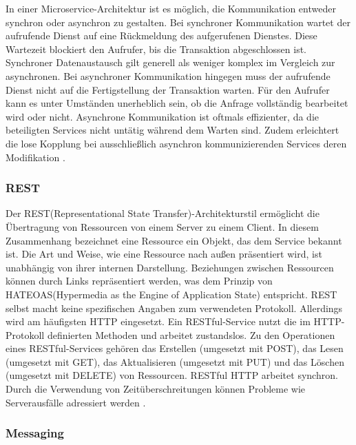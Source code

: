 {In einer Microservice-Architektur ist es möglich, die Kommunikation entweder synchron oder asynchron zu gestalten. Bei synchroner Kommunikation wartet der aufrufende Dienst auf eine Rückmeldung des aufgerufenen Dienstes. Diese Wartezeit blockiert den Aufrufer, bis die Transaktion abgeschlossen ist. Synchroner Datenaustausch gilt generell als weniger komplex im Vergleich zur asynchronen. Bei asynchroner Kommunikation hingegen muss der aufrufende Dienst nicht auf die Fertigstellung der Transaktion warten. Für den Aufrufer kann es unter Umständen unerheblich sein, ob die Anfrage vollständig bearbeitet wird oder nicht. Asynchrone Kommunikation ist oftmals effizienter, da die beteiligten Services nicht untätig während dem Warten sind. Zudem erleichtert die lose Kopplung bei ausschließlich asynchron kommunizierenden Services deren Modifikation \cite[S.260,261]{richards} \cite[S.161-163]{sommerville} \cite[S.70-71]{newman}.

\subsubsection{REST}

Der REST(Representational State Transfer)-Architekturstil ermöglicht die Übertragung von Ressourcen von einem Server zu einem Client. In diesem Zusammenhang bezeichnet eine Ressource ein Objekt, das dem Service bekannt ist. Die Art und Weise, wie eine Ressource nach außen präsentiert wird, ist unabhängig von ihrer internen Darstellung. Beziehungen zwischen Ressourcen können durch Links repräsentiert werden, was dem Prinzip von \glqq HATEOAS\grqq(Hypermedia as the Engine of Application State) entspricht. REST selbst macht keine spezifischen Angaben zum verwendeten Protokoll. Allerdings wird am häufigsten HTTP eingesetzt. Ein \glqq RESTful-Service\grqq{} nutzt die im HTTP-Protokoll definierten Methoden \cite{http} und arbeitet zustandslos. Zu den Operationen eines RESTful-Services gehören das Erstellen (umgesetzt mit \glqq POST\grqq), das Lesen (umgesetzt mit \glqq GET\grqq), das Aktualisieren (umgesetzt mit \glqq PUT\grqq) und das Löschen (umgesetzt mit \glqq DELETE\grqq) von Ressourcen. RESTful HTTP arbeitet synchron. Durch die Verwendung von Zeitüberschreitungen können Probleme wie Serverausfälle adressiert werden \cite[S.79-80]{newman} \cite[S. 182 - 183]{wolff} \cite[S.173-175]{sommerville}.

\subsubsection{Messaging}

}
